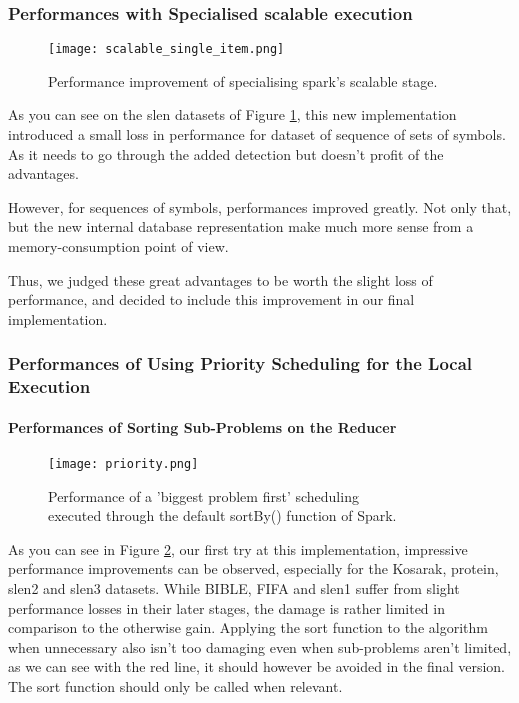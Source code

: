 \documentclass{eplmastersthesis}
\begin{document}
\subsubsection{Performances with Specialised scalable execution}

\begin{figure}[h]
  \centering
  \texttt{[image: scalable\_single\_item.png]}
  \caption{Performance improvement of specialising spark's scalable stage.}
  \label{fig:scalable_single_item}
\end{figure}

As you can see on the slen datasets of Figure \ref{fig:scalable_single_item}, this new implementation introduced a small loss in performance for dataset of sequence of sets of symbols. As it needs to go through the added detection but doesn't profit of the advantages. \newline

However, for sequences of symbols, performances improved greatly. Not only that, but the new internal database representation make much more sense from a memory-consumption point of view. \newline

Thus, we judged these great advantages to be worth the slight loss of performance, and decided to include this improvement in our final implementation.

\subsubsection{Performances of Using Priority Scheduling for the Local Execution}

\paragraph{Performances of Sorting Sub-Problems on the Reducer}

\begin{figure}[h]
  \centering
  \texttt{[image: priority.png]}
  \caption[Naive priority scheduling]{
  		Performance of a 'biggest problem first' scheduling \\
  		executed through the default sortBy() function of Spark.
  	\endtabular
  }
  \label{fig:priority_scheduling_performance_comparison}
\end{figure}

As you can see in Figure \ref{fig:priority_scheduling_performance_comparison}, our first try at this implementation, impressive performance improvements can be observed, especially for the Kosarak, protein, slen2 and slen3 datasets. While BIBLE, FIFA and slen1 suffer from slight performance losses in their later stages, the damage is rather limited in comparison to the otherwise gain. Applying the sort function to the algorithm when unnecessary also isn't too damaging even when sub-problems aren't limited, as we can see with the red line, it should however be avoided in the final version. The sort function should only be called when relevant.\newline
\end{document}
